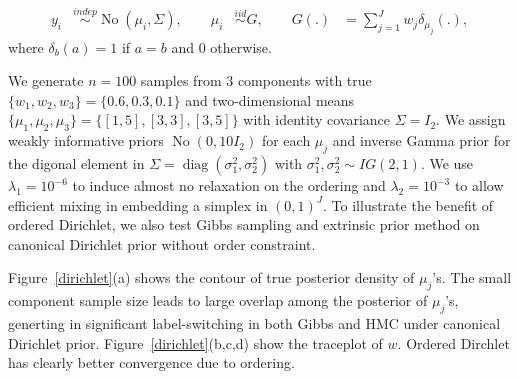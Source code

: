 \documentclass[10pt]{article}
\DeclareMathOperator{\No}{No}
\DeclareMathOperator{\diag}{diag}
\DeclareMathOperator{\1}{\mathbbm{1}}
\begin{document}
\begin{equation*}
\begin{aligned}
y_i &\stackrel{indep}{\sim} \No(\mu_i,\Sigma),\qquad
\mu_i &\stackrel{iid}{\sim} G,\qquad
G(.) & = \sum_{j=1}^{J} w_j \delta_{\mu_j}(.),
\end{aligned}
\end{equation*}
where $\delta_{b}(a)=1$ if $a=b$ and $0$ otherwise.

We generate $n=100$ samples from $3$ components with true $\{w_1,w_2,w_3\}=\{0.6,0.3,0.1\}$ and two-dimensional means $\{\mu_1,\mu_2,\mu_3\} = \{[1,5], [3,3], [3,5]\}$ with identity covariance $\Sigma = I_2$. We assign weakly informative priors $\No(0,10 I_2)$ for each $\mu_j$ and inverse Gamma prior for the digonal element in $\Sigma=\diag(\sigma_1^2,\sigma_2^2)$ with $\sigma^2_1, \sigma^2_2\sim IG(2,1)$. We use $\lambda_1 = 10^{-6}$ to induce almost no relaxation on the ordering and $\lambda_2 = 10^{-3}$ to allow efficient mixing in embedding a simplex in $(0,1)^J$. To illustrate the benefit of ordered Dirichlet, we also test Gibbs sampling and extrinsic prior method on canonical Dirichlet prior without order constraint.

Figure~\ref{dirichlet}(a) shows the contour of true posterior density of $\mu_j$'s. The small component sample size leads to large overlap among the posterior of $\mu_j$'s, generting in significant label-switching in both Gibbs and HMC under canonical Dirichlet prior. Figure~\ref{dirichlet}(b,c,d) show the traceplot of $w$. Ordered Dirchlet has clearly better convergence due to ordering.
\end{document}
